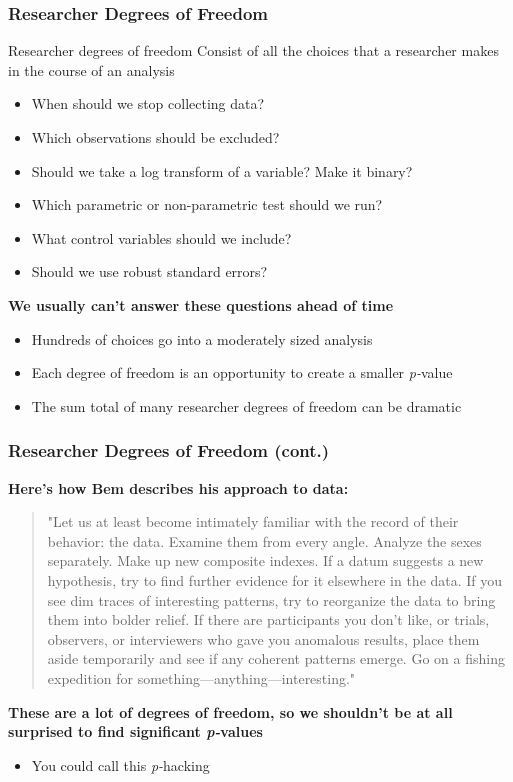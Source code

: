 \documentclass[10pt, block=fill]{beamer}
\begin{document}
\begin{frame}
    \frametitle{Researcher Degrees of Freedom}
    
    \begin{block}{Researcher degrees of freedom}
        Consist of all the choices that a researcher makes in the course of an analysis
    \end{block}
    
    \begin{itemize}
        \item When should we stop collecting data?
        \item Which observations should be excluded?
        \item Should we take a log transform of a variable? Make it binary?
        \item Which parametric or non-parametric test should we run?
        \item What control variables should we include?
        \item Should we use robust standard errors?
    \end{itemize}
    
    \textbf{We usually can't answer these questions ahead of time}
    \begin{itemize}
        \item Hundreds of choices go into a moderately sized analysis
        \item Each degree of freedom is an opportunity to create a smaller \textit{p-}value
        \item The sum total of many researcher degrees of freedom can be dramatic
    \end{itemize}
\end{frame}

\begin{frame}
    \frametitle{Researcher Degrees of Freedom (cont.)}
    
    \textbf{Here's how Bem describes his approach to data:}
    \begin{quote}
        "Let us at least become intimately familiar with the record of their behavior: the data. Examine them from every angle. Analyze the sexes separately. Make up new composite indexes. If a datum suggests a new hypothesis, try to find further evidence for it elsewhere in the data. If you see dim traces of interesting patterns, try to reorganize the data to bring them into bolder relief. If there are participants you don't like, or trials, observers, or interviewers who gave you anomalous results, place them aside temporarily and see if any coherent patterns emerge. Go on a fishing expedition for something—anything—interesting."
    \end{quote}

        \textbf{These are a lot of degrees of freedom, so we shouldn't be at all surprised to find significant \textit{p-}values}
    \begin{itemize}
        \item You could call this \textit{p-}hacking
    \end{itemize}

\end{frame}
\end{document}
